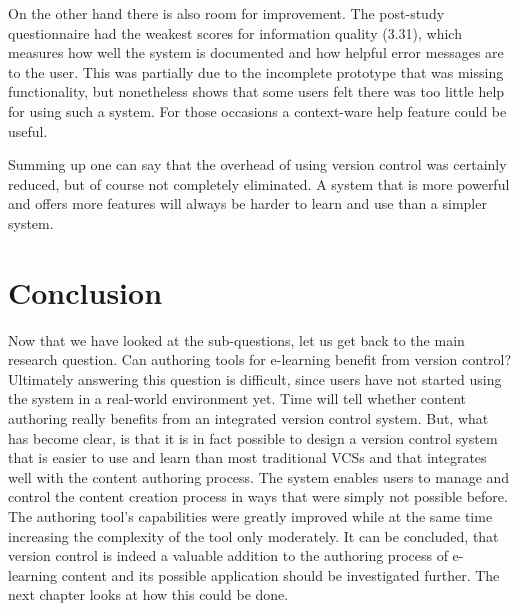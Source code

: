 On the other hand there is also room for improvement. The post-study questionnaire had the weakest scores for information quality (3.31), which measures how well the system is documented and how helpful error messages are to the user. This was partially due to the incomplete prototype that was  missing functionality, but nonetheless shows that some users felt there was too little help for using such a system. For those occasions a context-ware help feature could be useful.

Summing up one can say that the overhead of using version control was certainly reduced, but of course not completely eliminated. A system that is more powerful and offers more features will always be harder to learn and use than a simpler system.


\section{Conclusion}
Now that we have looked at the sub-questions, let us get back to the main research question. Can authoring tools for e-learning benefit from version control? Ultimately answering this question is difficult, since users have not started using the system in a real-world environment yet. Time will tell whether content authoring really benefits from an integrated version control system. But, what has become clear, is that it is in fact possible to design a version control system that is easier to use and learn than most traditional VCSs and that integrates well with the content authoring process. The system enables users to manage and control the content creation process in ways that were simply not possible before. The authoring tool's capabilities were greatly improved while at the same time increasing the complexity of the tool only moderately. It can be concluded, that version control is indeed a valuable addition to the authoring process of e-learning content and its possible application should be investigated further. The next chapter looks at how this could be done.









